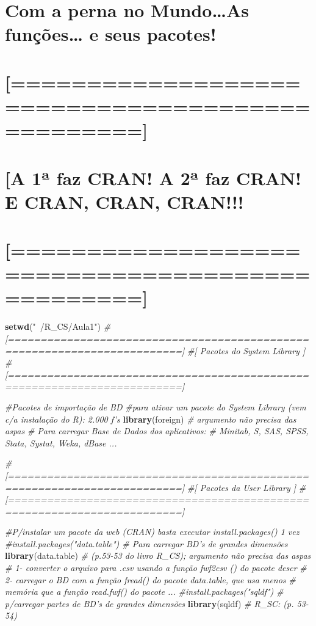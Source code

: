 \documentclass[]{article}
\newenvironment{Shaded}{\begin{snugshade}}{\end{snugshade}}
\newcommand{\KeywordTok}[1]{\textcolor[rgb]{0.13,0.29,0.53}{\textbf{#1}}}
\newcommand{\StringTok}[1]{\textcolor[rgb]{0.31,0.60,0.02}{#1}}
\newcommand{\CommentTok}[1]{\textcolor[rgb]{0.56,0.35,0.01}{\textit{#1}}}
\newcommand{\NormalTok}[1]{#1}
\begin{document}
\section{Com a perna no Mundo\ldots{}As funções\ldots{} e seus
pacotes!}\label{com-a-perna-no-mundoas-funcoes-e-seus-pacotes}

\section{{[}================================================{]}}\label{section}

\section{{[}A 1ª faz CRAN! A 2ª faz CRAN! E CRAN, CRAN,
CRAN!!!}\label{a-1-faz-cran-a-2-faz-cran-e-cran-cran-cran}

\section{{[}================================================{]}}\label{section-1}

\begin{Shaded}
\begin{Highlighting}[]
\KeywordTok{setwd}\NormalTok{(}\StringTok{"~/R_CS/Aula1"}\NormalTok{)}
\CommentTok{#[=========================================================================]}
\CommentTok{#[                   Pacotes do System Library                             ]}
\CommentTok{#[=========================================================================]}

\CommentTok{#Pacotes de importação de BD}
\CommentTok{#para ativar um pacote do System Library (vem c/a instalação do R): 2.000 f's}
\KeywordTok{library}\NormalTok{(foreign) }\CommentTok{# argumento não precisa das aspas}
\CommentTok{# Para carregar Base de Dados dos aplicativos:}
\CommentTok{# Minitab, S, SAS, SPSS, Stata, Systat, Weka, dBase ...}

\CommentTok{#[=========================================================================]}
\CommentTok{#[                    Pacotes da User Library                              ]}
\CommentTok{#[=========================================================================]}

\CommentTok{#P/instalar um pacote da web (CRAN) basta executar install.packages() 1 vez}
\CommentTok{#install.packages("data.table") # Para carregar BD's de grandes dimensões}
\KeywordTok{library}\NormalTok{(data.table) }\CommentTok{# (p.53-53 do livro R_CS); argumento não precisa das aspas}
\CommentTok{# 1- converter o arquivo para .csv usando a função fwf2csv () do pacote descr}
\CommentTok{# 2- carregar o BD com a função fread() do pacote data.table, que usa menos}
\CommentTok{#    memória que a função read.fwf() do pacote ...}
\CommentTok{#install.packages("sqldf") # p/carregar partes de BD's de grandes dimensões}
\KeywordTok{library}\NormalTok{(sqldf) }\CommentTok{# R_SC: (p. 53-54)}
\end{Highlighting}
\end{Shaded}
\end{document}
